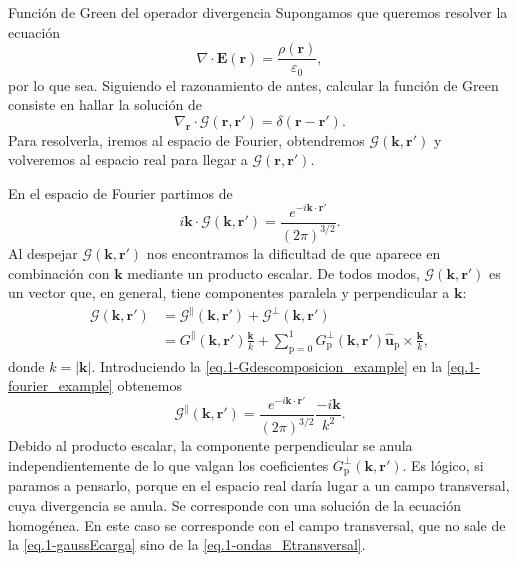 \begin{example}
    {Función de Green del operador divergencia
    \label{ej.1-divergencia_green}}
    Supongamos que queremos resolver la ecuación 
    \begin{equation}
        \nabla\cdot\mathbf{E}(\mathbf{r}) = \frac{\rho(\mathbf{r})}{\varepsilon_0},
    \end{equation}
    por lo que sea. Siguiendo el razonamiento de antes, calcular la función de Green consiste en hallar la solución de 
    \begin{equation}
        \nabla_\mathbf{r}\cdot\boldsymbol{\mathcal{G}}(\mathbf{r}, \mathbf{r}') = \delta(\mathbf{r}-\mathbf{r}').
    \end{equation}
    Para resolverla, iremos al espacio de Fourier, obtendremos \(\boldsymbol{\mathcal{G}}(\mathbf{k},\mathbf{r}')\) y volveremos al espacio real para llegar a \(\boldsymbol{\mathcal{G}}(\mathbf{r}, \mathbf{r}')\). 
    
    En el espacio de Fourier partimos de 
    \begin{equation}
        \label{eq.1-fourier_example}
        i\mathbf{k}\cdot \boldsymbol{\mathcal{G}}(\mathbf{k},\mathbf{r}') = \frac{e^{-i\mathbf{k}\cdot\mathbf{r}'}}{(2\pi)^{3/2}}.
    \end{equation}
    Al despejar \(\boldsymbol{\mathcal{G}}(\mathbf{k}, \mathbf{r}')\) nos encontramos la dificultad de que aparece en combinación con \(\mathbf{k}\) mediante un producto escalar. De todos modos, \(\boldsymbol{\mathcal{G}}(\mathbf{k}, \mathbf{r}')\) es un vector que, en general, tiene componentes paralela y perpendicular a \(\mathbf{k}\):
    \begin{align}
        \nonumber
        \boldsymbol{\mathcal{G}}(\mathbf{k}, \mathbf{r}') &= \boldsymbol{\mathcal{G}}^\parallel(\mathbf{k},\mathbf{r}') + \boldsymbol{\mathcal{G}}^\perp(\mathbf{k},\mathbf{r}') \\
        \label{eq.1-Gdescomposicion_example}
        &= G^\parallel(\mathbf{k}, \mathbf{r}') \frac{\mathbf{k}}{k} + \sum_\mathrm{p = 0}^1G_\mathrm{p}^\perp(\mathbf{k}, \mathbf{r}') \hat{\mathbf{u}}_\mathrm{p}\times \frac{\mathbf{k}}{k},
    \end{align}
    donde \(k = |\mathbf{k}|\). Introduciendo la \cref{eq.1-Gdescomposicion_example} en la \cref{eq.1-fourier_example} obtenemos
    \begin{equation}
        \boldsymbol{\mathcal{G}}^\parallel(\mathbf{k},\mathbf{r}') = \frac{e^{-i\mathbf{k}\cdot\mathbf{r}'}}{(2\pi)^{3/2}} \frac{-i\mathbf{k}}{k^2}.
    \end{equation}
    Debido al producto escalar, la componente perpendicular se anula independientemente de lo que valgan los coeficientes \(G_\mathrm{p}^\perp(\mathbf{k},\mathbf{r}')\). Es lógico, si paramos a pensarlo, porque en el espacio real daría lugar a un campo transversal, cuya divergencia se anula. Se corresponde con una solución de la ecuación homogénea. En este caso se corresponde con el campo transversal, que no sale de la \cref{eq.1-gaussEcarga} sino de la \cref{eq.1-ondas_Etransversal}.


\end{example}
